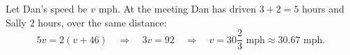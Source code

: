 Let Dan's speed be $v$ mph. At the meeting Dan has driven $3+2=5$ hours and Sally $2$ hours, over the same distance:
\[
5v=2(v+46)\quad\Longrightarrow\quad 3v=92\quad\Longrightarrow\quad v=\boxed{30\dfrac{2}{3}\text{ mph}}\approx30.67\text{ mph}.
\]
